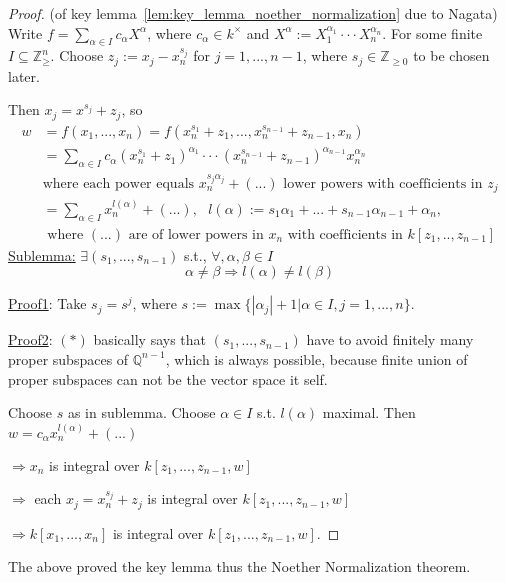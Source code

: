 \documentclass[11pt]{article}
\newcommand{\intg}{\mathbb Z}
\newcommand{\ratl}{\mathbb Q}
\newcommand{\Lrta}{\Longrightarrow}
\begin{document}
\begin{proof}(of key lemma~\ref{lem:key_lemma_noether_normalization} due to Nagata)
Write $f=\sum_{\alpha\in I}c_\alpha X^\alpha$, where $c_\alpha\in k^\times$ and $X^\alpha:=X_1^{\alpha_1}\cdot\cdot \cdot X^{\alpha_n}_n$. For some finite $I\subseteq \intg_{\geq }^n$. Choose $z_j:=x_j-x^{s_j}_n$ for $j=1,...,n-1$, where $s_j\in \intg_{\geq 0}$ to be chosen later.

Then $x_j=x^{s_j}+z_j$, so
$$
\begin{aligned}
w&=f(x_1,...,x_n)=f(x_n^{s_1}+z_1,...,x_n^{s_{n-1}}+z_{n-1},x_n)\\
&=\sum_{\alpha\in I}c_\alpha (x^{s_1}_n+z_1)^{\alpha_1}\cdot\cdot \cdot (x_n^{s_{n-1}}+z_{n-1})^{\alpha_{n-1}}x_n^{\alpha_n}\\
& \text{where each power equals } x_n^{s_j\alpha_j}+(...) \text{ lower powers with coefficients in $z_j$}\\
&=\sum_{\alpha\in I} x_n^{l(\alpha)}+(...),\ \ \ l(\alpha):=s_1\alpha_1+...+s_{n-1}\alpha_{n-1}+\alpha_n,\\ 
&\text{ where $(...)$ are of lower powers in $x_n$ with coefficients in $k[z_1,..,z_{n-1}]$}
\end{aligned}
$$
\underline{Sublemma:} $\exists (s_1,...,s_{n-1})$ s.t., $\forall, \alpha,\beta\in I$
\begin{equation}\tag*{(*)}
\alpha\neq \beta\Lrta l(\alpha)\neq l(\beta)
\end{equation}

\underline{Proof1}: Take $s_j=s^j$, where $s:=\max\{|\alpha_j|+1|\alpha\in I, j=1,...,n\}$.

\underline{Proof2}: $(*)$ basically says that $(s_1,...,s_{n-1})$ have to avoid finitely many proper subspaces of $\ratl^{n-1}$, which is always possible, because finite union of proper subspaces can not be the vector space it self.

Choose $s$ as in sublemma. Choose $\alpha\in I$ s.t. $l(\alpha)$ maximal. Then $w=c_\alpha x_n^{l(\alpha)}+(...)$

$\Lrta x_n$ is integral over $k[z_1,...,z_{n-1},w]$

$\Lrta$ each $x_{j}=x_n^{s_j}+z_j$ is integral over $k[z_1,...,z_{n-1},w]$

$\Lrta k[x_1,...,x_n]$ is integral over $k[z_1,...,z_{n-1},w]$.
\end{proof}

The above proved the key lemma thus the Noether Normalization theorem.
\end{document}

